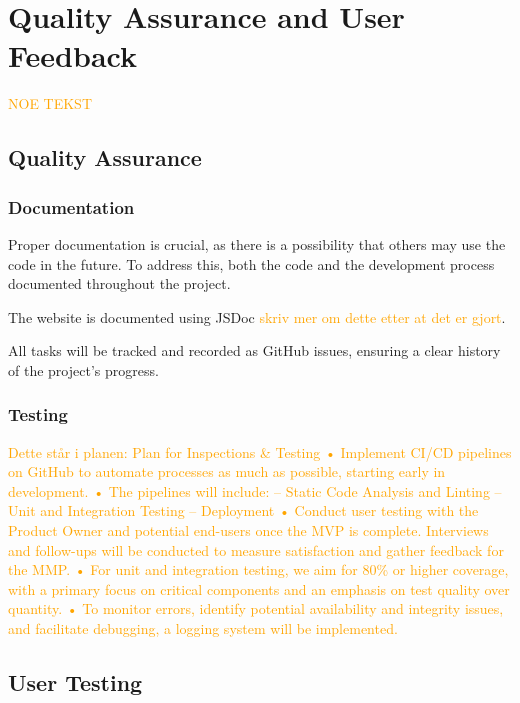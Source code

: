 \chapter{Quality Assurance and User Feedback}\label{chap:testinganduserfeedback}

\textcolor{orange}{NOE TEKST}

\section{Quality Assurance}

\subsection{Documentation}

Proper documentation is crucial, as there is a possibility that others may use the code in the
future. To address this, both the code and the development process documented
throughout the project. 

The website is documented using JSDoc \textcolor{orange}{skriv mer om dette etter at det er gjort}.  


All tasks will be tracked and recorded as GitHub issues, ensuring a clear
history of the project’s progress. 

\subsection{Testing} %

\textcolor{orange}{Dette står i planen: Plan for Inspections & Testing
• Implement CI/CD pipelines on GitHub to automate processes as much as possible, starting
early in development.
• The pipelines will include:
– Static Code Analysis and Linting
– Unit and Integration Testing
– Deployment
• Conduct user testing with the Product Owner and potential end-users once the MVP is
complete. Interviews and follow-ups will be conducted to measure satisfaction and gather
feedback for the MMP.
• For unit and integration testing, we aim for 80\% or higher coverage, with a primary focus on
critical components and an emphasis on test quality over quantity.
• To monitor errors, identify potential availability and integrity issues, and facilitate debugging,
a logging system will be implemented.}

\section{User Testing}

